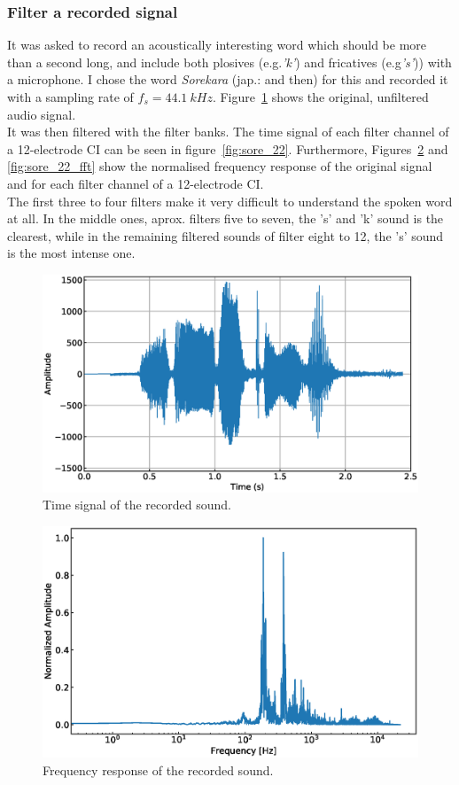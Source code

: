 \documentclass{scrartcl}			%
\begin{document}
\newpage
\subsubsection{Filter a recorded signal}
It was asked to record an acoustically interesting word which should be more than a second long, and include both plosives (e.g.\textit{’k’}) and fricatives (e.g\textit{’s’})) with a microphone. I chose the word \textit{Sorekara} (jap.: and then) for this and recorded it with a sampling rate of $f_s = \SI{44.1}{kHz} $. Figure~\ref{fig:sore} shows the original, unfiltered audio signal.\\
It was then filtered with the filter banks. The time signal of each filter channel of a 12-electrode CI can be seen in figure~\ref{fig:sore_22}.  Furthermore, Figures~\ref{fig:sore_fft} and \ref{fig:sore_22_fft} show the normalised frequency response of the original signal and for each filter channel of a 12-electrode CI.\\The first three to four filters make it very difficult to understand the spoken word at all. In the middle ones, aprox. filters five to  seven, the 's' and 'k' sound is the clearest, while in the remaining filtered sounds of filter eight to 12, the 's' sound is the most intense one. 

\begin{figure}[H]
\centering
\includegraphics[width=0.8\linewidth]{imgs/sorekara.eps}
    \caption{Time signal of the recorded sound.} 
    \label{fig:sore} 
\end{figure}

\begin{figure}[H]
\centering
\includegraphics[width=0.8\linewidth]{imgs/sorekara_fft.eps}
    \caption{Frequency response of the recorded sound.} 
    \label{fig:sore_fft} 
\end{figure}
\end{document}

